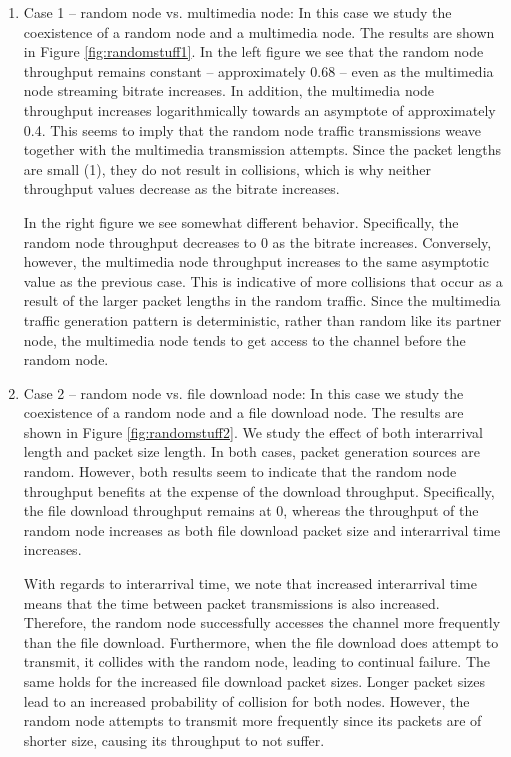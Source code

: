 \documentclass{llncs}
\begin{document}
\begin{enumerate}
	\item Case 1 -- random node vs. multimedia node: In this case we study the coexistence of a random node and a multimedia node. The results are shown in Figure \ref{fig:randomstuff1}. In the left figure we see that the random node throughput remains constant -- approximately 0.68 -- even as the multimedia node streaming bitrate increases. In addition, the multimedia node throughput increases logarithmically towards an asymptote of approximately 0.4. This seems to imply that the random node traffic transmissions weave together with the multimedia transmission attempts. Since the packet lengths are small (1), they do not result in collisions, which is why neither throughput values decrease as the bitrate increases.

	In the right figure we see somewhat different behavior. Specifically, the random node throughput decreases to 0 as the bitrate increases. Conversely, however, the multimedia node throughput increases to the same asymptotic value as the previous case. This is indicative of more collisions that occur as a result of the larger packet lengths in the random traffic. Since the multimedia traffic generation pattern is deterministic, rather than random like its partner node, the multimedia node tends to get access to the channel before the random node. 

	\item Case 2 -- random node vs. file download node: In this case we study the coexistence of a random node and a file download node. The results are shown in Figure \ref{fig:randomstuff2}. We study the effect of both interarrival length and packet size length. In both cases, packet generation sources are random. However, both results seem to indicate that the random node throughput benefits at the expense of the download throughput. Specifically, the file download throughput remains at 0, whereas the throughput of the random node increases as both file download packet size and interarrival time increases. 

	With regards to interarrival time, we note that increased interarrival time means that the time between packet transmissions is also increased. Therefore, the random node successfully accesses the channel more frequently than the file download. Furthermore, when the file download does attempt to transmit, it collides with the random node, leading to continual failure. The same holds for the increased file download packet sizes. Longer packet sizes lead to an increased probability of collision for both nodes. However, the random node attempts to transmit more frequently since its packets are of shorter size, causing its throughput to not suffer.


\end{enumerate}
\end{document}
